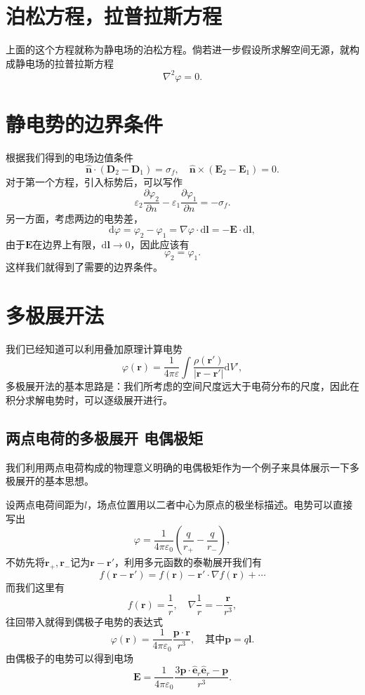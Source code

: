 \documentclass[UTF8]{ctexbook}
\renewcommand{\d}{\mathrm{d}}
\renewcommand{\b}{\boldsymbol}
\numberwithin{equation}{chapter}
\begin{document}
	\section{泊松方程，拉普拉斯方程}
	上面的这个方程就称为静电场的泊松方程。倘若进一步假设所求解空间无源，就构成静电场的拉普拉斯方程
	\[\nabla^2 \varphi=0.\]
	
	\section{静电势的边界条件}
	根据我们得到的电场边值条件
	\[\hat{\b{n}}\cdot(\b{D}_2-\b{D}_1)=\sigma_f,\quad \hat{\b{n}}\times(\b{E}_2-\b{E}_1)=0.\]
	对于第一个方程，引入标势后，可以写作
	\[\varepsilon_2\frac{\partial \varphi_2}{\partial n}-\varepsilon_1\frac{\partial  \varphi_1}{\partial n}=-\sigma_f.\]
	另一方面，考虑两边的电势差，
	\[\d \varphi=\varphi_2-\varphi_1=\nabla\varphi\cdot\d\b{l}=-\b{E}\cdot\d\b{l},\]
	由于$\b{E}$在边界上有限，$\d\b{l}\rightarrow 0$，因此应该有
	\[\varphi_2=\varphi_1.\]
	这样我们就得到了需要的边界条件。
	
	\section{多极展开法}
	我们已经知道可以利用叠加原理计算电势
	\[\varphi(\b{r})=\frac{1}{4\pi\varepsilon}\int \frac{\rho(\b{r}')}{|\b{r}-\b{r}'|}\d V',\]
	多极展开法的基本思路是：我们所考虑的空间尺度远大于电荷分布的尺度，因此在积分求解电势时，可以逐级展开进行。
	\subsection{两点电荷的多极展开 电偶极矩}
	我们利用两点电荷构成的物理意义明确的电偶极矩作为一个例子来具体展示一下多极展开的基本思想。
	
	设两点电荷间距为$l$，场点位置用以二者中心为原点的极坐标描述。电势可以直接写出
	\[\varphi=\frac{1}{4\pi\varepsilon_0}\left(\frac{q}{r_+}-\frac{q}{r_-}\right),\]
	不妨先将$\b{r}_+,\b{r}_-$记为$\b{r}-\b{r}'$，利用多元函数的泰勒展开我们有
	\[f(\b{r}-\b{r}')=f(\b{r})-\b{r}'\cdot\nabla f(\b{r})+\cdots \]
	而我们这里有
	\[f(\b{r})=\frac{1}{r},\quad \nabla\frac{1}{r}=-\frac{\b{r}}{r^3},\]
	往回带入就得到偶极子电势的表达式
	\[\varphi(\b{r})=\frac{1}{4\pi\varepsilon_0}\frac{\b{p}\cdot\b{r}}{r^3},\quad \text{其中}\b{p}=q\b{l}.\]
	由偶极子的电势可以得到电场
	\[\b{E}=\frac{1}{4\pi\varepsilon_0} \frac{3\b{p}\cdot\hat{\b{e}}_r\hat{\b{e}}_r-\b{p}}{r^3}.\]
	
\end{document}
